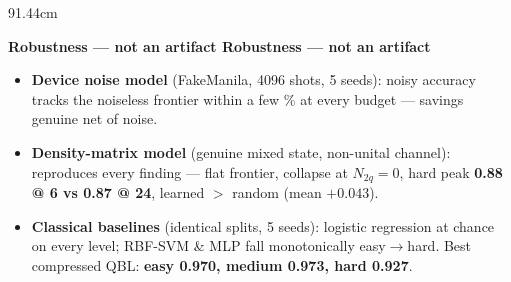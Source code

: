 \documentclass[final]{beamer}
\newlength{\colw}
\newlength{\sepw}
\newcommand{\secbar}[2]{%
  \vspace{0.15ex}%
  \begin{tcolorbox}[
      enhanced, sharp corners, boxrule=0pt, frame hidden,
      colback=dukenavy, left=10pt, right=10pt, top=7pt, bottom=7pt,
      width=\linewidth, before skip=4pt, after skip=8pt]
    \color{white}\bfseries\large
    \if\relax\detokenize{#1}\relax
      #2%
    \else
      \makebox[1.55cm][l]{[#1]}\hspace{0.2cm}#2%
    \fi
  \end{tcolorbox}%
}
\newcommand{\tl}{\textbf}  %
\begin{document}
\begin{frame}[t]{}
\begin{textblock*}{91.44cm}
\begin{minipage}[t]{\colw}
\secbar{6}{Robustness — not an artifact}
\begin{cbox}
\begin{itemize}
  \item \tl{Device noise model} (FakeManila, 4096 shots, 5 seeds): noisy accuracy tracks
        the noiseless frontier within a few \% at every budget — savings genuine net of
        noise.
  \item \tl{Density-matrix model} (genuine mixed state, non-unital channel): reproduces
        every finding — flat frontier, collapse at $N_{2q}=0$, hard peak
        \tl{0.88 @ 6 vs 0.87 @ 24}, learned $>$ random (mean \tl{$+0.043$}).
  \item \tl{Classical baselines} (identical splits, 5 seeds): logistic regression at
        chance on every level; RBF-SVM \& MLP fall monotonically easy$\to$hard. Best
        compressed QBL: \tl{easy 0.970, medium 0.973, hard 0.927}.
\end{itemize}
\end{cbox}

\end{minipage}%
\hspace{\sepw}%
\begin{minipage}[t]{\colw}


\end{minipage}
\end{textblock*}
\end{frame}
\end{document}
